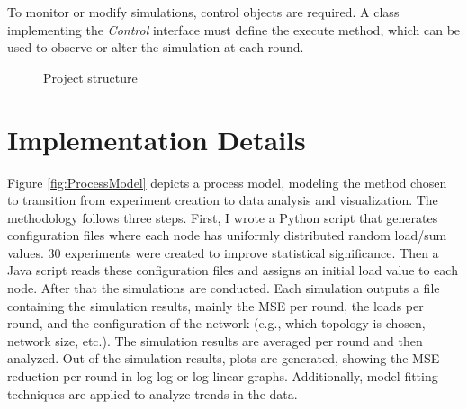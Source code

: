 To monitor or modify simulations, control objects are required. A class implementing the \textit{Control} interface must define the execute method, which can be used to observe or alter the simulation at each round. \cite{peersimdocs}

\begin{figure}
    \centering
    \caption{Project structure}
    \label{fig:uml}
\end{figure}

\section{Implementation Details}\label{sec:implementationdetails}
Figure \ref{fig:ProcessModel} depicts a process model, modeling the method chosen to transition from experiment creation to data analysis and visualization. The methodology follows three steps. First, I wrote a Python script that generates configuration files where each node has uniformly distributed random load/sum values. 30 experiments were created to improve statistical significance. Then a Java script reads these configuration files and assigns an initial load value to each node. After that the simulations are conducted. Each simulation outputs a file containing the simulation results, mainly the MSE per round, the loads per round, and the configuration of the network (e.g., which topology is chosen, network size, etc.). The simulation results are averaged per round and then analyzed. Out of the simulation results, plots are generated, showing the MSE reduction per round in log-log or log-linear graphs. Additionally, model-fitting techniques are applied to analyze trends in the data.

